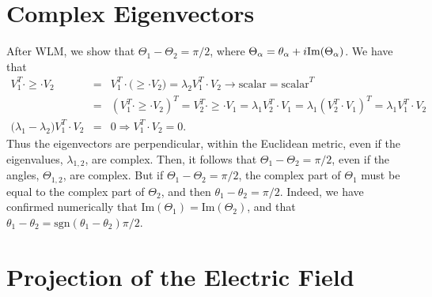 \documentclass[preprint,12pt]{revtex4}
\begin{document}
\section{Complex Eigenvectors}\label{app}
After WLM, we show that $\Theta_1-\Theta_2=\pi/2$, where 
$\Theta_\alpha=\theta_\alpha+i\mathrm{Im}(\Theta_\alpha)$.
We have that
\begin{eqnarray}\label{wlm.1}
V_1^T\cdot\ge\cdot V_2
&=&
V_1^T\cdot\big(\ge\cdot V_2\big)
=
\lambda_2V_1^T\cdot V_2\to\mathrm{scalar}=\mathrm{scalar}^T
\nonumber\\
&=&
(V_1^T\cdot\ge\cdot V_2)^T
=
V_2^T\cdot\ge\cdot V_1
=
\lambda_1
V_2^T\cdot V_1
=
\lambda_1
(V_2^T\cdot V_1)^T
=
\lambda_1
V_1^T\cdot V_2
\nonumber\\
\big(\lambda_1-\lambda_2\big)
V_1^T\cdot V_2
&=&
0
\Rightarrow
V_1^T\cdot V_2=0
.
\end{eqnarray}
Thus the eigenvectors are perpendicular, within the Euclidean metric,
even if the eigenvalues, $\lambda_{1,2}$, are complex.
Then, it follows that
$\Theta_1-\Theta_2=\pi/2$,
 even if the angles, $\Theta_{1,2}$, are  complex. 
But if $\Theta_1-\Theta_2=\pi/2$, the complex part of $\Theta_1$ must
be equal to the complex part of $\Theta_2$, and then
$\theta_1-\theta_2=\pi/2$.  
Indeed, we have confirmed numerically that
$\mathrm{Im}(\Theta_1)=\mathrm{Im}(\Theta_2)$, and that
$\theta_1-\theta_2=\mathrm{sgn}(\theta_1-\theta_2)\pi/2$.

\section{Projection of the Electric Field}
\end{document}

